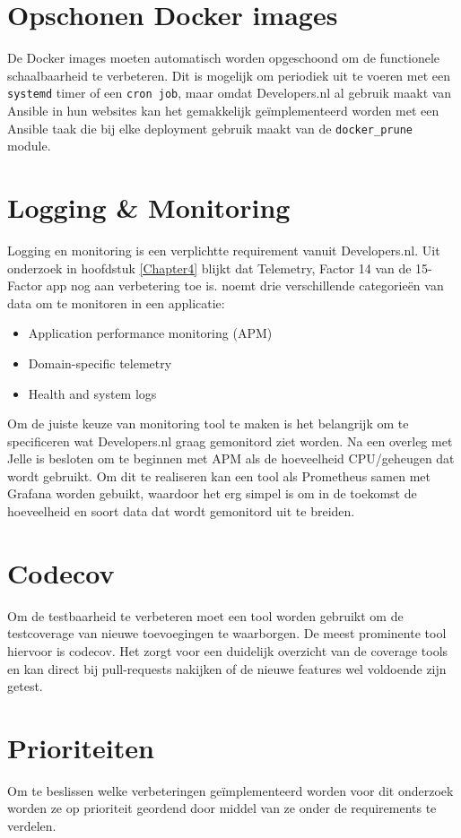 \section{Opschonen Docker images}
De Docker images moeten automatisch worden opgeschoond om de functionele schaalbaarheid te verbeteren. Dit is mogelijk om periodiek uit te voeren met een \texttt{systemd} timer of een \texttt{cron job}, maar omdat Developers.nl al gebruik maakt van Ansible in hun websites kan het gemakkelijk geïmplementeerd worden met een Ansible taak die bij elke deployment gebruik maakt van de \texttt{docker\_prune} module.

\section{Logging \& Monitoring}
Logging en monitoring is een verplichtte requirement vanuit Developers.nl. Uit onderzoek in hoofdstuk \ref{Chapter4} blijkt dat Telemetry, Factor 14 van de 15-Factor app nog aan verbetering toe is. \parencite{Beyond12Factor} noemt drie verschillende categorieën van data om te monitoren in een applicatie:
\begin{itemize}
	\item Application performance monitoring (APM)
	\item Domain-specific telemetry
	\item Health and system logs
\end{itemize}

Om de juiste keuze van monitoring tool te maken is het belangrijk om te specificeren wat Developers.nl graag gemonitord ziet worden. Na een overleg met Jelle is besloten om te beginnen met APM als de hoeveelheid CPU/geheugen dat wordt gebruikt. Om dit te realiseren kan een tool als Prometheus samen met Grafana worden gebuikt, waardoor het erg simpel is om in de toekomst de hoeveelheid en soort data dat wordt gemonitord uit te breiden.

\section{Codecov}
Om de testbaarheid te verbeteren moet een tool worden gebruikt om de testcoverage van nieuwe toevoegingen te waarborgen. De meest prominente tool hiervoor is codecov. Het zorgt voor een duidelijk overzicht van de coverage tools en kan direct bij pull-requests nakijken of de nieuwe features wel voldoende zijn getest.

\section{Prioriteiten}
Om te beslissen welke verbeteringen geïmplementeerd worden voor dit onderzoek worden ze op prioriteit geordend door middel van ze onder de requirements te verdelen.

